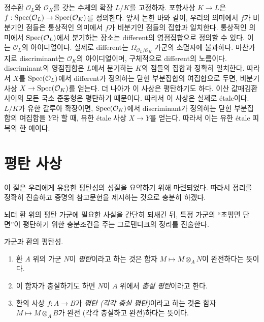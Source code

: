 \begin{example}
\label{example-number-theory-etale}
정수환 $\mathcal{O}_L$와 $\mathcal{O}_K$를 갖는 수체의 확장
$L/K$를 고정하자. 포함사상 $K \to L$은
$f : \mathop{\mathrm{Spec}}(\mathcal{O}_L) \to \mathop{\mathrm{Spec}}(\mathcal{O}_K)$를 정의한다.
앞서 논한 바와 같이, 우리의 의미에서 $f$가 비분기인 점들은
통상적인 의미에서 $f$가 비분기인 점들의 집합과 일치한다.
통상적인 의미에서 $\mathop{\mathrm{Spec}}(\mathcal{O}_L)$에서 분기하는 장소는
different의 영점집합으로 정의할 수 있다. 이는
$\mathcal{O}_L$의 아이디얼이다. 실제로 different는
$\Omega_{\mathcal{O}_L/\mathcal{O}_K}$ 가군의 소멸자에 불과하다.
마찬가지로 discriminant는 $\mathcal{O}_K$의 아이디얼이며,
구체적으로 different의 노름이다.
discriminant의 영점집합은 $L$에서 분기하는 $K$의 점들의
집합과 정확히 일치한다.
따라서 $X$를 $\mathop{\mathrm{Spec}}(\mathcal{O}_L)$에서 different가 정의하는
닫힌 부분집합의 여집합으로 두면,
비분기 사상 $X \to \mathop{\mathrm{Spec}}(\mathcal{O}_K)$를 얻는다.
더 나아가 이 사상은 평탄하기도 하다. 이산 값매김환 사이의
모든 국소 준동형은 평탄하기 때문이다. 따라서 이 사상은 실제로
\'etale이다. $L/K$가 유한 갈루아 확장이면,
$\mathop{\mathrm{Spec}}(\mathcal{O}_K)$에서 discriminant가 정의하는 닫힌
부분집합의 여집합을 $Y$라 할 때, 유한 \'etale 사상
$X \to Y$를 얻는다.
따라서 이는 유한 \'etale 피복의 한 예이다.
\end{example}


\section{평탄 사상}
\label{section-flat-morphisms}

\noindent
이 절은 우리에게 유용한 평탄성의 성질을 요약하기 위해 마련되었다.
따라서 정리를 정확히 진술하고 증명의 참고문헌을 제시하는 것으로
충분히 하겠다.

\medskip\noindent
뇌터 환 위의 평탄 가군에 필요한 사실을 간단히 되새긴 뒤,
특정 가군의 “초평면 단면”이 평탄하기 위한 충분조건을 주는
그로텐디크의 정리를 진술한다.

\begin{definition}
\label{definition-flat-rings}
가군과 환의 평탄성.
\begin{enumerate}
\item 환 $A$ 위의 가군 $N$이 {\it 평탄}이라고 하는 것은
함자 $M \mapsto M \otimes_A N$이 완전하다는 뜻이다.
\item 이 함자가 충실하기도 하면 $N$이 $A$ 위에서
{\it 충실 평탄}이라고 한다.
\item 환의 사상 $f : A \to B$가
{\it 평탄 (각각 충실 평탄)}이라고 하는 것은
함자 $M \mapsto M \otimes_A B$가 완전
(각각 충실하고 완전)하다는 뜻이다.
\end{enumerate}
\end{definition}

